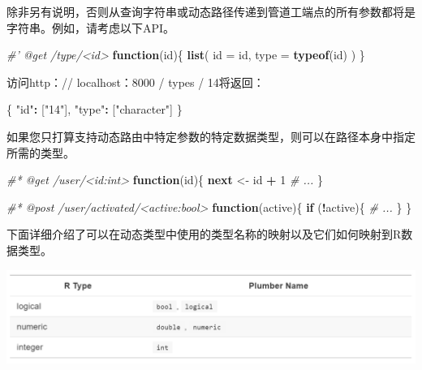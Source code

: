 \documentclass[]{book}
\newenvironment{Shaded}{\begin{snugshade}}{\end{snugshade}}
\newcommand{\KeywordTok}[1]{\textcolor[rgb]{0.13,0.29,0.53}{\textbf{#1}}}
\newcommand{\DataTypeTok}[1]{\textcolor[rgb]{0.13,0.29,0.53}{#1}}
\newcommand{\DecValTok}[1]{\textcolor[rgb]{0.00,0.00,0.81}{#1}}
\newcommand{\StringTok}[1]{\textcolor[rgb]{0.31,0.60,0.02}{#1}}
\newcommand{\CommentTok}[1]{\textcolor[rgb]{0.56,0.35,0.01}{\textit{#1}}}
\newcommand{\ControlFlowTok}[1]{\textcolor[rgb]{0.13,0.29,0.53}{\textbf{#1}}}
\newcommand{\OperatorTok}[1]{\textcolor[rgb]{0.81,0.36,0.00}{\textbf{#1}}}
\newcommand{\NormalTok}[1]{#1}
\begin{document}
除非另有说明，否则从查询字符串或动态路径传递到管道工端点的所有参数都将是字符串。例如，请考虑以下API。

\begin{Shaded}
\begin{Highlighting}[]
\CommentTok{#' @get /type/<id>}
\ControlFlowTok{function}\NormalTok{(id)\{}
  \KeywordTok{list}\NormalTok{(}
    \DataTypeTok{id =}\NormalTok{ id,}
    \DataTypeTok{type =} \KeywordTok{typeof}\NormalTok{(id)}
\NormalTok{  )}
\NormalTok{\}}
\end{Highlighting}
\end{Shaded}

访问http：// localhost：8000 / types / 14将返回：

\begin{Shaded}
\begin{Highlighting}[]
\NormalTok{\{}
  \StringTok{"id"}\OperatorTok{:}\StringTok{ }\NormalTok{[}\StringTok{"14"}\NormalTok{],}
  \StringTok{"type"}\OperatorTok{:}\StringTok{ }\NormalTok{[}\StringTok{"character"}\NormalTok{]}
\NormalTok{\}}
\end{Highlighting}
\end{Shaded}

如果您只打算支持动态路由中特定参数的特定数据类型，则可以在路径本身中指定所需的类型。

\begin{Shaded}
\begin{Highlighting}[]
\CommentTok{#* @get /user/<id:int>}
\ControlFlowTok{function}\NormalTok{(id)\{}
  \ControlFlowTok{next}\NormalTok{ <-}\StringTok{ }\NormalTok{id }\OperatorTok{+}\StringTok{ }\DecValTok{1}
  \CommentTok{# ...}
\NormalTok{\}}

\CommentTok{#* @post /user/activated/<active:bool>}
\ControlFlowTok{function}\NormalTok{(active)\{}
  \ControlFlowTok{if}\NormalTok{ (}\OperatorTok{!}\NormalTok{active)\{}
    \CommentTok{# ...}
\NormalTok{  \}}
\NormalTok{\}}
\end{Highlighting}
\end{Shaded}

下面详细介绍了可以在动态类型中使用的类型名称的映射以及它们如何映射到R数据类型。

\includegraphics{pic/plumber/p4.png}
\end{document}
